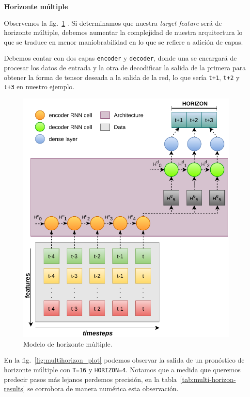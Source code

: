 \documentclass[a4paper,12pt]{article}
\begin{document}
\textbf{Horizonte múltiple}

Observemos la fig.~\ref{fig:multihorizon_model} \citep{rnn_ed_azure}. Si determinamos que nuestra \textit{target feature} será de horizonte múltiple, debemos aumentar la complejidad de nuestra arquitectura lo que se traduce en menor maniobrabilidad en lo que se refiere a adición de capas.

Debemos contar con dos capas \texttt{encoder} y \texttt{decoder}, donde una se encargará de procesar los datos de entrada y la otra de decodificar la salida de la primera para obtener la forma de tensor deseada a la salida de la red, lo que sería \texttt{t+1}, \texttt{t+2} y \texttt{t+3} en nuestro ejemplo.

\begin{figure}[H]
	\begin{center}
	\includegraphics[width=1\textwidth]{multihorizon-model.pdf}
  	\caption{Modelo de horizonte múltiple.}
  	\label{fig:multihorizon_model}
  	\end{center}
\end{figure}

En la fig.~\ref{fig:multihorizon_plot} podemos observar la salida de un pronóstico de horizonte múltiple con \texttt{T=16} y \texttt{HORIZON=4}. Notamos que a medida que queremos predecir pasos más lejanos perdemos precisión, en la tabla~\ref{tab:multi-horizon-results} se corrobora de manera numérica esta observación.
\end{document}
